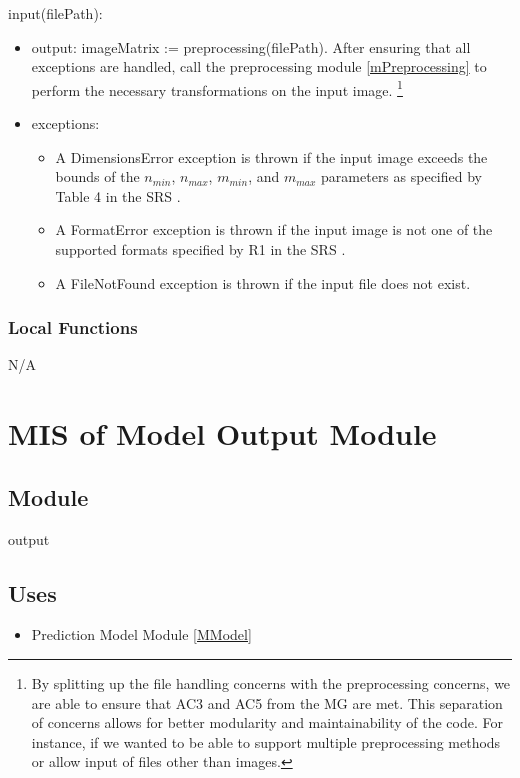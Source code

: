 \documentclass[12pt, titlepage]{article}
\begin{document}
\noindent input(filePath):
\begin{itemize} 
\item output: imageMatrix := preprocessing(filePath). After ensuring that all
exceptions are handled, call the preprocessing module \ref{mPreprocessing} to
perform the necessary transformations on the input image. \footnote{By splitting
up the file handling concerns with the preprocessing concerns, we are able to
ensure that AC3 and AC5 from the MG \citep{MG} are met. This separation of
concerns allows for better modularity and maintainability of the code. For
instance, if we wanted to be able to support multiple preprocessing methods or
allow input of files other than images.}
\item exceptions:
\begin{itemize}
  \item A DimensionsError exception is thrown if the input image
  exceeds the bounds of the $n_{min}$, $n_{max}$, $m_{min}$, and $m_{max}$
  parameters as specified by Table 4 in the SRS \citep[4.2.6]{SRS}.
  \item A FormatError exception is thrown if the input image is not one of the supported formats
  specified by R1 in the SRS \citep[5.1.1]{SRS}.
  \item A FileNotFound exception is thrown if the input file does not exist.
\end{itemize}
\end{itemize}

\subsubsection{Local Functions}

N/A

\newpage
\section{MIS of Model Output Module} \label{MOutput}

\subsection{Module}

output
\subsection{Uses}

\begin{itemize}
  \item Prediction Model Module \ref{MModel}
\end{itemize}
\end{document}
